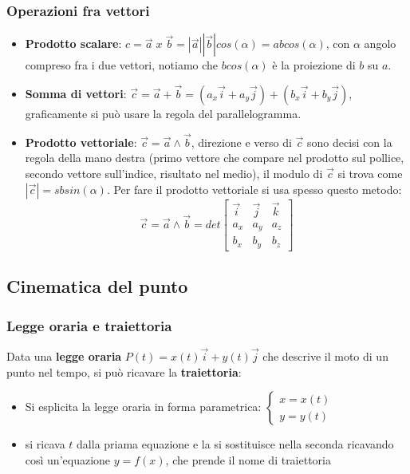 \subsubsection{Operazioni fra vettori}
\begin{itemize}
    \item \textbf{Prodotto scalare}: $c = \vec{a} \; x \; \vec{b} = |\vec{a}| | \vec{b}| cos(\alpha) = a b cos(\alpha)$, con $\alpha$ angolo compreso fra i due vettori, notiamo che $b cos(\alpha)$ è la proiezione di $b$ su $a$.
    \item \textbf{Somma di vettori}: $\vec{c} = \vec{a} + \vec{b} = (a_x \vec{i} + a_y \vec{j}) + (b_x \vec{i} + b_y \vec{j})$, graficamente si può usare la regola del parallelogramma.
    \item \textbf{Prodotto vettoriale}: $\vec{c} = \vec{a} \land \vec{b}$, direzione e verso di $\vec{c}$ sono decisi con la regola della mano destra (primo vettore che compare nel prodotto sul pollice, secondo vettore sull'indice, risultato nel medio), il modulo di $\vec{c}$ si trova come $|\vec{c}| = s b sin(\alpha)$.\newline
    Per fare il prodotto vettoriale si usa spesso questo metodo: 
    \[
        \vec{c} = \vec{a} \land \vec{b} = det \left[\begin{matrix}
            \vec{i} & \vec{j} & \vec{k}\\
            a_x & a_y & a_z \\
            b_x & b_y & b_z
        \end{matrix}\right]
    \]
\end{itemize}
\subsection{Cinematica del punto}
\subsubsection{Legge oraria e traiettoria}
Data una \textbf{legge oraria} $P(t) = x(t) \vec{i} + y(t) \vec{j}$ che descrive il moto di un punto nel tempo, si può ricavare la \textbf{traiettoria}:
\begin{itemize}
    \item Si esplicita la legge oraria in forma parametrica: $\begin{cases}
        x = x(t)\\ y= y(t)
    \end{cases}$
    \item si ricava $t$ dalla priama equazione e la si sostituisce nella seconda ricavando così un'equazione $y = f(x)$, che prende il nome di traiettoria
\end{itemize}
